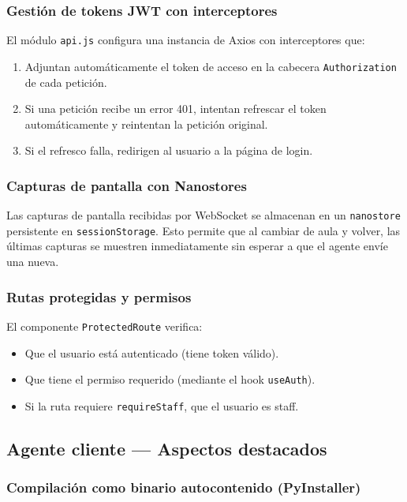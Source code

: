 \documentclass[12pt, a4paper, twoside]{article}
\begin{document}
\subsubsection{Gestión de tokens JWT con interceptores}

El módulo \texttt{api.js} configura una instancia de Axios con interceptores que:

\begin{enumerate}
  \item Adjuntan automáticamente el token de acceso en la cabecera \texttt{Authorization} de cada petición.
  \item Si una petición recibe un error 401, intentan refrescar el token automáticamente y reintentan la petición original.
  \item Si el refresco falla, redirigen al usuario a la página de login.
\end{enumerate}

\subsubsection{Capturas de pantalla con Nanostores}

Las capturas de pantalla recibidas por WebSocket se almacenan en un \texttt{nanostore} persistente en \texttt{sessionStorage}. Esto permite que al cambiar de aula y volver, las últimas capturas se muestren inmediatamente sin esperar a que el agente envíe una nueva.

\subsubsection{Rutas protegidas y permisos}

El componente \texttt{ProtectedRoute} verifica:

\begin{itemize}
  \item Que el usuario está autenticado (tiene token válido).
  \item Que tiene el permiso requerido (mediante el hook \texttt{useAuth}).
  \item Si la ruta requiere \texttt{requireStaff}, que el usuario es staff.
\end{itemize}

\subsection{Agente cliente — Aspectos destacados}

\subsubsection{Compilación como binario autocontenido (PyInstaller)}
\end{document}
